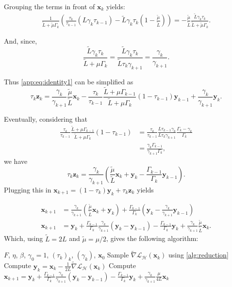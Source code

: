 \documentclass{article}
\def\vx{{\bm{x}}}
\def\vy{{\bm{y}}}
\def\vz{{\bm{z}}}
\newcommand{\tens}[1]{\bm{\mathsfit{#1}}}
\def\tL{{\tens{L}}}
\renewcommand{\tL}{\tilde{L}}
\newcommand{\tmu}{\tilde{\mu}}
\newcommand{\cH}{\mathcal{H}}
\newcommand{\cL}{\mathcal{L}}
\theoremstyle{plain}
\theoremstyle{definition}
\theoremstyle{remark}
\begin{document}
Grouping the terms in front of $\vx_k$ yields:
\begin{align*}
    \frac{1}{\tL + \tmu \Gamma_k}\left( \frac{\tau_k}{\tau_{k-1}} (L\gamma_{k}\tau_{k-1}) - \tL \gamma_k \tau_k(1-\frac{\tmu}{\tL})\right)= -\frac{\tmu}{\tL}\frac{\tL\gamma_k \tau_k}{\tL + \tmu\Gamma_k}.
\end{align*}

And, since, 
\begin{equation}
\label{app:eq:identity3}
    \frac{\tL\gamma_k \tau_k}{\tL +\mu \Gamma_{k}} = \frac{\tL\gamma_k \tau_k}{\tL\tau_{k}\gamma_{k+1}} = \frac{\gamma_k}{\gamma_{k+1}}.
\end{equation}

Thus \cref{app:eq:identity1} can be simplified as 
\begin{equation}
\label{app:eq:identity4}
    \tau_k\vz_k =  \frac{\gamma_k}{\gamma_{k+1}}\frac{\tmu}{\tL}\vx_k - \frac{\tau_k}{\tau_{k-1}}\frac{\tL +\mu \Gamma_{k-1}}{\tL +\mu \Gamma_{k}}  (1-\tau_{k-1})\vy_{k-1} + \frac{\gamma_k}{\gamma_{k+1}}\vy_k .
\end{equation}

Eventually, considering that
\begin{align*}
    \frac{\tau_k}{\tau_{k-1}}\frac{\tL +\mu \Gamma_{k-1}}{\tL +\mu \Gamma_{k}}  (1-\tau_{k-1}) 
    &=\frac{\tau_k}{\tau_{k-1}}\frac{L\tau_{k-1}\gamma_k}{L\tau_{k}\gamma_{k+1}}  \frac{\Gamma_k - \gamma_k}{\Gamma_k}\\
    &= \frac{\gamma_k \Gamma_{k-1}}{\gamma_{k+1}\Gamma_k},
\end{align*}
we have
\[
\tau_k \vz_k = \frac{\gamma_k}{\gamma_{k+1}}(\frac{\tmu}{\tL}\vx_k + \vy_k - \frac{\Gamma_{k-1}}{\Gamma_k}\vy_{k-1}).
\]
Plugging this in $\vx_{k+1} = (1-\tau_k)\vy_k + \tau_k \vz_k$ yields

\begin{align*}
    \vx_{k+1} &= \frac{\gamma_k}{\gamma_{k+1}}( \frac{\tmu}{\tL} \vx_k + \vy_k) + \frac{\Gamma_{k-1}}{\Gamma_k}\left( \vy_k - \frac{\gamma_k}{\gamma_{k+1}} \vy_{k-1}\right)\\
    \vx_{k+1}&=\vy_k + \frac{\Gamma_{k-1}}{\Gamma_k}\frac{\gamma_k}{\gamma_{k+1}}(\vy_k - \vy_{k-1}) - \frac{\Gamma_{k-1}}{\Gamma_k}\vy_k + \frac{\gamma_k}{\gamma_{k+1}}\frac{\tmu}{\tL}\vx_k .
\end{align*}
 Which, using $\tL = 2L$ and $\tmu = \mu/2$, gives the following algorithm:
\begin{algorithm}[h]
  \caption{Byzantine-Resilient Fast Gradient Method}
  \begin{algorithmic}
     $F$, $\eta$, $\beta$, $\gamma_0 = 1$, $(\tau_k)_k$, $(\gamma_k)$, $\vx_0$
     \STATE Sample $\tilde\nabla \cL_{\cH}(\vx_k)$ using \cref{alg:reduction}
    \STATE Compute $\vy_{k} = \vx_k - \frac{1}{2L}\tilde{\nabla}\cL_{\cH}(\vx_k)$ 
    \STATE Compute $\vx_{k+1}=\vy_k + \frac{\Gamma_{k-1}}{\Gamma_k}\frac{\gamma_k}{\gamma_{k+1}}(\vy_k - \vy_{k-1}) - \frac{\Gamma_{k-1}}{\Gamma_k}\vy_k + \frac{\gamma_k}{\gamma_{k+1}}\frac{\mu}{4L}\vx_k$
    \ENDFOR
  \end{algorithmic}
\end{algorithm}
\end{document}
